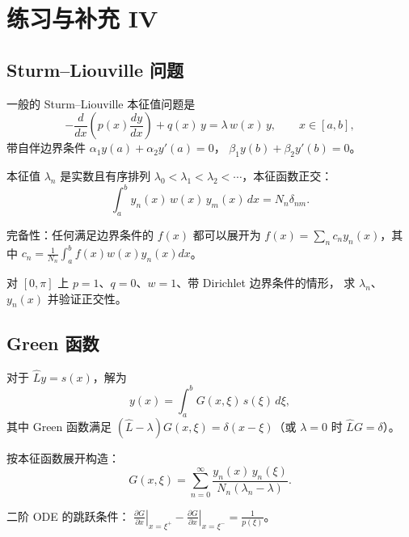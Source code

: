 \chapter{练习与补充 IV}

\section{Sturm--Liouville 问题}

一般的 Sturm--Liouville 本征值问题是
\begin{equation}
-\frac{d}{dx}\!\left(p(x)\frac{dy}{dx}\right) + q(x)\,y = \lambda\,w(x)\,y,
\qquad x\in[a,b],
\label{eq:8.1.1}
\end{equation}
带自伴边界条件
$\alpha_1 y(a)+\alpha_2 y'(a)=0$，
$\beta_1 y(b)+\beta_2 y'(b)=0$。

本征值 $\lambda_n$ 是实数且有序排列
$\lambda_0<\lambda_1<\lambda_2<\cdots$，本征函数正交：
\begin{equation}
\int_a^b y_n(x)\,w(x)\,y_m(x)\,dx = N_n\delta_{nm}.
\label{eq:8.1.2}
\end{equation}

完备性：任何满足边界条件的 $f(x)$ 都可以展开为
$f(x)=\sum_n c_n y_n(x)$，其中
$c_n = \frac{1}{N_n}\int_a^b f(x)w(x)y_n(x)dx$。

\begin{exercise}
对 $[0,\pi]$ 上 $p=1$、$q=0$、$w=1$、带 Dirichlet 边界条件的情形，
求 $\lambda_n$、$y_n(x)$ 并验证正交性。
\end{exercise}

\section{Green 函数}

对于 $\hat L y = s(x)$，解为
\begin{equation}
y(x) = \int_a^b G(x,\xi)\,s(\xi)\,d\xi,
\label{eq:8.2.1}
\end{equation}
其中 Green 函数满足
$(\hat L-\lambda)G(x,\xi) = \delta(x-\xi)$（或 $\lambda=0$ 时 $\hat L G=\delta$）。

按本征函数展开构造：
\begin{equation}
G(x,\xi) = \sum_{n=0}^{\infty}\frac{y_n(x)\,y_n(\xi)}{N_n(\lambda_n-\lambda)}.
\label{eq:8.2.2}
\end{equation}

二阶 ODE 的跳跃条件：
$\left.\frac{\partial G}{\partial x}\right|_{x=\xi^+}
-\left.\frac{\partial G}{\partial x}\right|_{x=\xi^-} = \frac{1}{p(\xi)}$。


